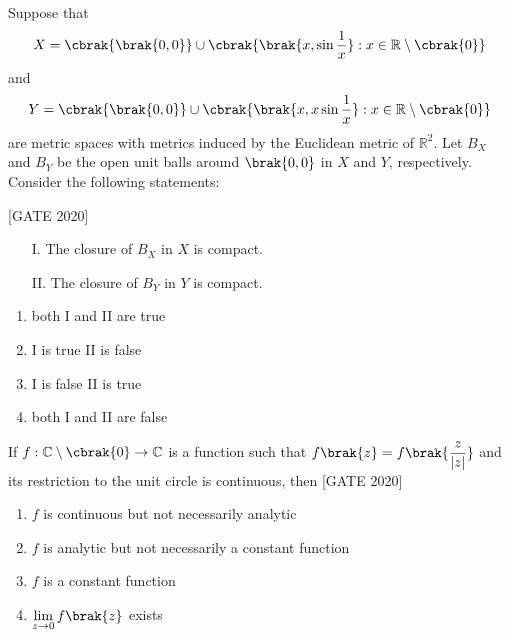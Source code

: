     \item  Suppose that
    \begin{align*}
    X = \cbrak{\brak{0,0}} \cup \cbrak{ \brak{ x, \sin \dfrac{1}{x} } : x \in \mathbb{R} \setminus \cbrak{0} }
    \end{align*}
    and
    \begin{align*}
    Y = \cbrak{\brak{0,0}} \cup \cbrak{ \brak{ x, x \sin \dfrac{1}{x} } : x \in \mathbb{R} \setminus \cbrak{0} }
    \end{align*}
    are metric spaces with metrics induced by the Euclidean metric of $\mathbb{R}^2$. Let $B_X$ and $B_Y$ be the open unit balls around $\brak{0,0}$ in $X$ and $Y$, respectively. Consider the following statements:
    
    \hfill{[GATE 2020]}\begin{multicols}{2}\begin{enumerate}
        \item[I.] The closure of $B_X$ in $X$ is compact.
        \item[II.] The closure of $B_Y$ in $Y$ is compact.
    \end{enumerate}\end{multicols}
    \begin{multicols}{2}\begin{enumerate}
        \item both I and II are true
        \item I is true II is false 
         \item I is false II is true 
         \item both I and II are false
    \end{enumerate}\end{multicols}
    
\item If $f: \mathbb{C} \setminus \cbrak{0} \to \mathbb{C}$ is a function such that $f\brak{z} = f\brak{ \dfrac{z}{|z|}}$ and its restriction to the unit circle is continuous, then
    \hfill{[GATE 2020]}
       \begin{enumerate}
            \item $f$ is continuous but not necessarily analytic
            \item $f$ is analytic but not necessarily a constant function
            \item $f$ is a constant function
            \item $\lim\limits_{z \to 0} f\brak{z}$ exists
        \end{enumerate}

